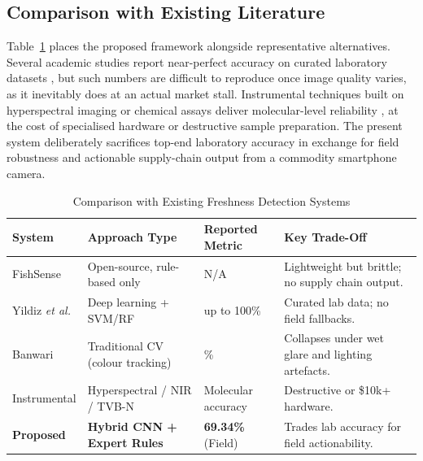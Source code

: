 \documentclass[conference]{IEEEtran}
\begin{document}
\subsection{Comparison with Existing Literature}
Table~\ref{tab:comparison_new} places the proposed framework alongside representative alternatives. Several academic studies report near-perfect accuracy on curated laboratory datasets \cite{ref19}, but such numbers are difficult to reproduce once image quality varies, as it inevitably does at an actual market stall. Instrumental techniques built on hyperspectral imaging or chemical assays deliver molecular-level reliability \cite{ref3, ref18}, at the cost of specialised hardware or destructive sample preparation. The present system deliberately sacrifices top-end laboratory accuracy in exchange for field robustness and actionable supply-chain output from a commodity smartphone camera.

\begin{table}[h]
\centering
\caption{Comparison with Existing Freshness Detection Systems}
\label{tab:comparison_new}
\begin{tabular}{>{\raggedright\arraybackslash}p{1.8cm} >{\raggedright\arraybackslash}p{2.5cm} >{\raggedright\arraybackslash}p{1.2cm} >{\raggedright\arraybackslash}p{2cm}}
\toprule
\textbf{System} & \textbf{Approach Type} & \textbf{Reported Metric} & \textbf{Key Trade-Off} \\
\midrule
FishSense\footnotemark[1] & Open-source, rule-based only & N/A & Lightweight but brittle; no supply chain output. \\
\rowcolor{gray!10}
Yildiz \textit{et al.} \cite{ref19} & Deep learning + SVM/RF & up to 100\% & Curated lab data; no field fallbacks. \\
Banwari\footnotemark[2] & Traditional CV (colour tracking) & 96.67\% & Collapses under wet glare and lighting artefacts. \\
\rowcolor{gray!10}
Instrumental \cite{ref3,ref18} & Hyperspectral / NIR / TVB-N & Molecular accuracy & Destructive or \$10k+ hardware. \\
\textbf{Proposed} & \textbf{Hybrid CNN + Expert Rules} & \textbf{69.34\%} (Field) & Trades lab accuracy for field actionability. \\
\bottomrule
\end{tabular}
\end{table}

\end{document}
